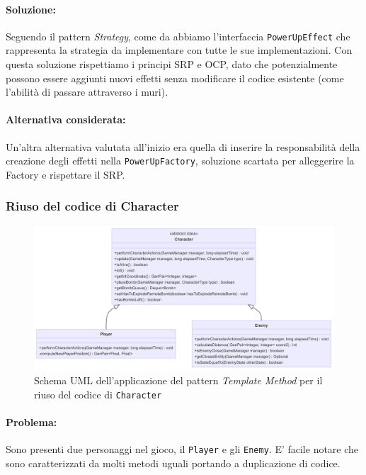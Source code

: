 \documentclass[a4paper,12pt]{report}
\begin{document}
\paragraph{Soluzione:} Seguendo il pattern \textit{Strategy}, come da
 abbiamo l'interfaccia \texttt{PowerUpEffect} che rappresenta la strategia da implementare con tutte le sue implementazioni. Con questa soluzione rispettiamo i principi SRP e OCP, dato che potenzialmente possono essere aggiunti nuovi effetti senza modificare il codice esistente (come l'abilità di passare attraverso i muri).
\paragraph{Alternativa considerata:} Un'altra alternativa valutata all'inizio era quella di inserire la responsabilità della creazione degli effetti nella \texttt{PowerUpFactory}, soluzione scartata per alleggerire la Factory e rispettare il SRP.

\subsubsection{Riuso del codice di Character}
\begin{figure}[H]
\centering{}
\includegraphics[width=1.0\columnwidth]{img/character-template-method-uml.png}
\caption{Schema UML dell’applicazione del pattern \textit{Template Method} per il riuso del codice di \texttt{Character}}
\label{img:uml-character-template-method}
\end{figure}
\paragraph{Problema:} Sono presenti due personaggi nel gioco, il \texttt{Player} e gli \texttt{Enemy}. E' facile notare che sono caratterizzati da molti metodi uguali portando a duplicazione di codice.
\end{document}
